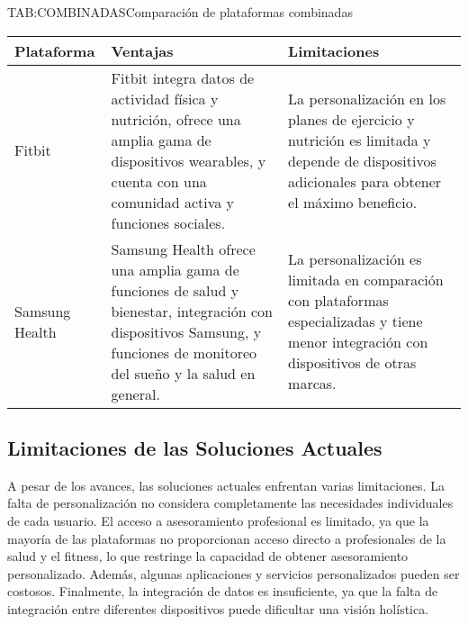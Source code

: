 \begin{table}[Comparación de plataformas combinadas]{TAB:COMBINADAS}{Comparación de plataformas combinadas}
  \begin{tabular}{|p{3cm}|p{5cm}|p{5cm}|}
    \hline
    \textbf{Plataforma} & \textbf{Ventajas} & \textbf{Limitaciones} \\
    \hline
    Fitbit & Fitbit integra datos de actividad física y nutrición, ofrece una amplia gama de dispositivos wearables, y cuenta con una comunidad activa y funciones sociales. & La personalización en los planes de ejercicio y nutrición es limitada y depende de dispositivos adicionales para obtener el máximo beneficio. \\
    \hline
    Samsung Health & Samsung Health ofrece una amplia gama de funciones de salud y bienestar, integración con dispositivos Samsung, y funciones de monitoreo del sueño y la salud en general. & La personalización es limitada en comparación con plataformas especializadas y tiene menor integración con dispositivos de otras marcas. \\
    \hline
  \end{tabular}
\end{table}

\subsection{Limitaciones de las Soluciones Actuales}

A pesar de los avances, las soluciones actuales enfrentan varias limitaciones. La falta de personalización no considera completamente las necesidades individuales de cada usuario. El acceso a asesoramiento profesional es limitado, ya que la mayoría de las plataformas no proporcionan acceso directo a profesionales de la salud y el fitness, lo que restringe la capacidad de obtener asesoramiento personalizado. Además, algunas aplicaciones y servicios personalizados pueden ser costosos. Finalmente, la integración de datos es insuficiente, ya que la falta de integración entre diferentes dispositivos puede dificultar una visión holística.
